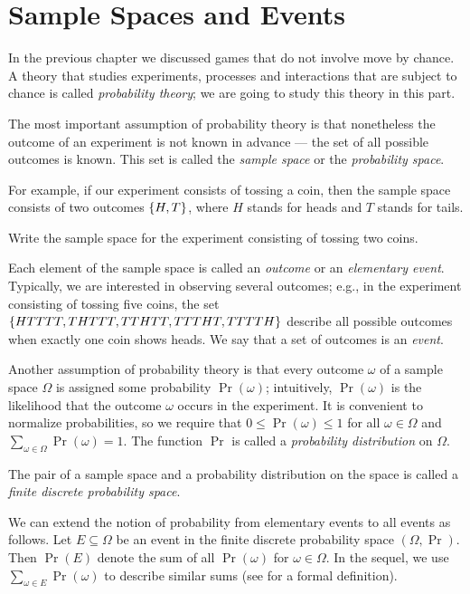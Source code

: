 \chapter{Sample Spaces and Events}
In the previous chapter we discussed games that do not involve move by chance.
A theory that studies experiments, processes and interactions that are subject
to chance is called \emph{probability theory}; we are going to study this theory
in this part.

The most important assumption of probability theory is that nonetheless the
outcome of an experiment is not known in advance --- the set of all possible
outcomes is known. This set is called the \emph{sample space} or the
\emph{probability space}.

For example, if our experiment consists of tossing a coin, then the sample space
consists of two outcomes $\set{H, T}$, where $H$ stands for heads and $T$ stands
for tails.
\begin{exercise}
  Write the sample space for the experiment consisting of tossing two coins.
\end{exercise}
Each element of the sample space is called an \emph{outcome} or an
\emph{elementary event}. Typically, we are interested in observing several
outcomes; e.g., in the experiment consisting of tossing five coins, the set
$\set{HTTTT, THTTT, TTHTT, TTTHT, TTTTH}$ describe all possible outcomes when
exactly one coin shows heads. We say that a set of outcomes is an \emph{event}.

Another assumption of probability theory is that every outcome $\omega$ of a
sample space $\Omega$ is assigned some probability $\Pr(\omega)$; intuitively,
$\Pr(\omega)$ is the likelihood that the outcome $\omega$ occurs in the
experiment. It is convenient to normalize probabilities, so we require that 
$0 \le \Pr(\omega) \le 1$ for all $\omega \in \Omega$ and 
$\sum_{\omega \in \Omega} \Pr(\omega) = 1$. The function $\Pr$ is called
a \emph{probability distribution} on $\Omega$.

The pair of a sample space and a probability distribution on the space is called
a \emph{finite discrete probability space}.


We can extend the notion of probability from elementary events to all events as
follows. Let $E \subseteq \Omega$ be an event in the finite discrete probability
space $(\Omega, \Pr)$. Then $\Pr(E)$ denote the sum of all $\Pr(\omega)$ for
$\omega \in \Omega$. In the sequel, we use $\sum_{\omega \in E} \Pr(\omega)$ to
describe similar sums (see  for a formal
definition).



